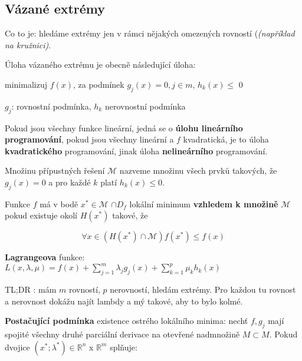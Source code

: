 \subsection{Vázané extrémy}

Co to je: hledáme extrémy jen v rámci nějakých omezených rovností (\textit{(například na kružnici)}.

\vspace{4pt}
\noindent Úloha vázaného extrému je obecně následující úloha:

minimalizuj $f(x)$,
za podmínek $g_j(x) = 0, j \in m$, $h_k(x) \leq$ 0 

$g_j$: rovnostní podmínka, $h_k$ nerovnostní podmínka

\vspace{4pt}
\noindent Pokud jsou všechny funkce lineární, jedná se o \textbf{úlohu lineárního programová\-ní}, pokud jsou všechny lineární a $f$ kvadratická, je to úloha \textbf{kvadratického} programování, jinak úloha \textbf{nelineárního} programování.

\vspace{4pt}
\noindent Množinu přípustných řešení $\mathcal{M}$ nazveme množinu všech prvků takových, že $g_j(x) = 0$ a pro každé $k$ platí $h_k(x) \leq 0$.

\vspace{4pt}
\noindent Funkce $f$ má v bodě $x^* \in \mathcal{M}$ $\cap D_f$ lokální minimum \textbf{vzhledem k množině} $\mathcal{M}$ pokud existuje okolí $H(x^*)$ takové, že

\begin{equation}
    \forall x \in ( H(x^*) \cap \mathcal{M} ) f(x^*) \leq  f(x)
\end{equation}

\vspace{4pt}
\noindent \textbf{Lagrangeova} funkce: $L(x,\lambda,\mu) = f(x) + \sum_{j=1}^{m}{\lambda_j g_j (x)} + \sum_{k=1}^{p}{\mu_k h_k (x)}$

\vspace{4pt}
\noindent TL;DR : mám $m$ rovností, $p$ nerovností, hledám extrémy. Pro každou tu rovnost a nerovnost dokážu najít lambdy a mý takové, aby to bylo kolmé.

\vspace{4pt}
\noindent \textbf{Postačující podmínka} existence ostrého lokálního minima: nechť $f, g_j$ mají spojité všechny druhé parciální derivace na otevřené nadmnožině $M \subset M$. Pokud dvojice $(x^*;\lambda^*) \in \mathbb{R}^n$ x $\mathbb{R}^m$ splňuje:

